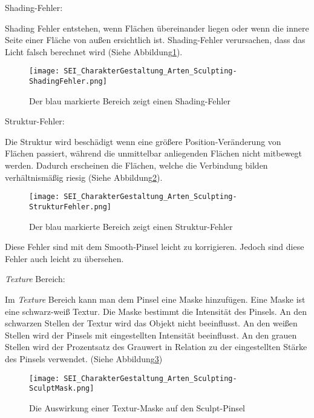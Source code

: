 Shading-Fehler:

Shading Fehler entstehen, wenn Flächen übereinander liegen oder wenn
die innere Seite einer Fläche von außen ersichtlich ist. Shading-Fehler
verursachen, dass das Licht falsch berechnet wird (Siehe Abbildung\ref{picture:shading_fehler}).

\begin{figure}[H]
    \centering
    \texttt{[image: SEI\_CharakterGestaltung\_Arten\_Sculpting-ShadingFehler.png]}
    \caption{Der blau markierte Bereich zeigt einen Shading-Fehler}
    \label{picture:shading_fehler}
\end{figure}


Struktur-Fehler:

Die Struktur wird beschädigt wenn eine größere Position-Veränderung von Flächen passiert, während die unmittelbar
anliegenden Flächen nicht mitbewegt werden. Dadurch erscheinen die Flächen, welche die Verbindung bilden
verhältnismäßig riesig (Siehe Abbildung\ref{picture:struktur_fehler}).

\begin{figure}[H]
    \centering
    \texttt{[image: SEI\_CharakterGestaltung\_Arten\_Sculpting-StrukturFehler.png]}
    \caption{Der blau markierte Bereich zeigt einen Struktur-Fehler}
    \label{picture:struktur_fehler}
\end{figure}



Diese Fehler sind mit dem Smooth-Pinsel leicht zu korrigieren.
Jedoch sind diese Fehler auch leicht zu übersehen.


\textit{Texture} Bereich\citep{blender:tex_mask}:

Im \textit{Texture} Bereich kann man dem Pinsel eine Maske hinzufügen. Eine Maske ist eine schwarz-weiß Textur.
Die Maske bestimmt die Intensität des Pinsels. An den schwarzen Stellen der Textur wird das Objekt nicht
beeinflusst. An den weißen Stellen wird der Pinsels mit eingestellten Intensität beeinflusst.
An den grauen Stellen wird der Prozentsatz des Grauwert in Relation zu der eingestellten
Stärke des Pinsels verwendet. (Siehe Abbildung\ref{picture:sculpt_tex_mask})


\begin{figure}[H]
    \centering
    \texttt{[image: SEI\_CharakterGestaltung\_Arten\_Sculpting-SculptMask.png]}
    \caption{Die Auswirkung einer Textur-Maske auf den Sculpt-Pinsel}
    \label{picture:sculpt_tex_mask}
\end{figure}

